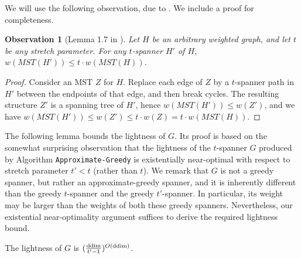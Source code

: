 \documentclass[11pt,letterpaper]{article}
\newtheorem{observation}[lemma]{Observation}
\newcommand{\ddim}{{\rm ddim}}
\begin{document}
We will use the following observation, due to \cite{Smid07}. We include a proof for completeness.
\begin{observation} [Lemma 1.7 in \cite{Smid07}] \label{mstsimple2}
	Let $H$ be an arbitrary weighted graph, and let $t$ be any stretch parameter.
	For any $t$-spanner $H'$ of $H$, $w(MST(H')) \le t \cdot w(MST(H))$.
\end{observation}
\begin{proof}
	Consider an MST $Z$ for $H$.
	Replace each edge of $Z$ by a $t$-spanner path in $H'$ between the endpoints of that edge, and then break cycles.
	The resulting structure $Z'$ is a spanning tree of $H'$, hence $w(MST(H')) \le w(Z')$, and we have
	$w(MST(H')) \le w(Z') \le t \cdot w(Z) = t \cdot w(MST(H))$.
\end{proof}

The following lemma bounds the lightness of $G$.
Its proof is based on the somewhat surprising observation that the lightness of the $t$-spanner $G$ produced by Algorithm \texttt{Approximate-Greedy} is existentially near-optimal with respect to stretch parameter $t' < t$ (rather than $t$).
We remark that $G$ is not a greedy spanner, but rather an approximate-greedy spanner,
and it is inherently different than the greedy $t$-spanner and the greedy $t'$-spanner.
In particular, its weight may be larger than the weights of both these greedy spanners.
Nevertheless, our existential near-optimality argument suffices to derive the required lightness bound.
\begin{lemma}
	The lightness of $G$ is $(\frac{\ddim}{t'-1})^{O(\ddim)}$.
\end{lemma}
\end{document}

